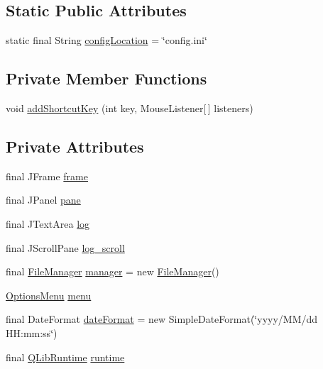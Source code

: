 \subsection*{Static Public Attributes}
\begin{DoxyCompactItemize}
\item 
static final String \hyperlink{classqlib_1_1ide_1_1QLibIDE_ae54da93b399d4d027f33c04ba7e392fd}{config\+Location} = \char`\"{}config.\+ini\char`\"{}
\end{DoxyCompactItemize}
\subsection*{Private Member Functions}
\begin{DoxyCompactItemize}
\item 
void \hyperlink{classqlib_1_1ide_1_1QLibIDE_a6f9aa8bdf86b91b456239c96202d2e3f}{add\+Shortcut\+Key} (int key, Mouse\+Listener\mbox{[}$\,$\mbox{]} listeners)
\end{DoxyCompactItemize}
\subsection*{Private Attributes}
\begin{DoxyCompactItemize}
\item 
final J\+Frame \hyperlink{classqlib_1_1ide_1_1QLibIDE_a13a62cb428150031089c3824f16d6bef}{frame}
\item 
final J\+Panel \hyperlink{classqlib_1_1ide_1_1QLibIDE_a599d44725656f74ca6d6fc028b8973a8}{pane}
\item 
final J\+Text\+Area \hyperlink{classqlib_1_1ide_1_1QLibIDE_aa92d671c5f0158e59c86767109afc92c}{log}
\item 
final J\+Scroll\+Pane \hyperlink{classqlib_1_1ide_1_1QLibIDE_a74ee30733f7d424f2e518f1171d70917}{log\+\_\+scroll}
\item 
final \hyperlink{classqlib_1_1ide_1_1FileManager}{File\+Manager} \hyperlink{classqlib_1_1ide_1_1QLibIDE_a5af68fc042aeee1b69f27f3e1e67610b}{manager} = new \hyperlink{classqlib_1_1ide_1_1FileManager}{File\+Manager}()
\item 
\hyperlink{classqlib_1_1ide_1_1OptionsMenu}{Options\+Menu} \hyperlink{classqlib_1_1ide_1_1QLibIDE_ae822573114cbc618b4af0ddf3726b06b}{menu}
\item 
final Date\+Format \hyperlink{classqlib_1_1ide_1_1QLibIDE_ac1128e9b1f1d79af9c480383ab6a16ac}{date\+Format} = new Simple\+Date\+Format(\char`\"{}yyyy/MM/dd H\+H\+:mm\+:ss\char`\"{})
\item 
final \hyperlink{classqlib_1_1ide_1_1QLibRuntime}{Q\+Lib\+Runtime} \hyperlink{classqlib_1_1ide_1_1QLibIDE_a07b6d9558a76bd5d818a98debdb93d5f}{runtime}
\end{DoxyCompactItemize}


